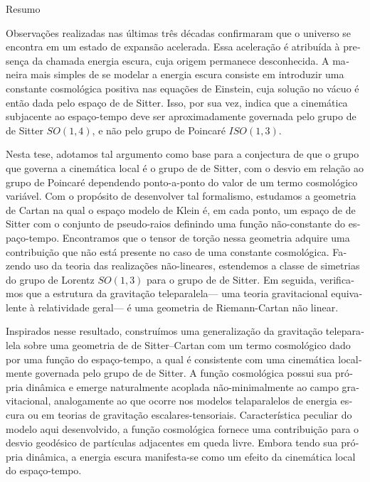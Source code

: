 \begin{otherlanguage}{portuguese}
{\large\selectfont%
\begin{center}Resumo\end{center}}

Observações realizadas nas últimas três décadas confirmaram que 
o universo se encontra em um estado de expansão acelerada. Essa 
ace\-le\-ração é atribuída à presença da chamada energia escura, 
cuja origem permanece desconhecida. A maneira mais simples de se 
modelar a energia escura consiste em introduzir uma constante 
cosmológica positiva nas equações de Einstein, cuja solução no 
vácuo é então dada pelo espaço de de Sitter. Isso, por sua vez, 
indica que a cinemática subjacente ao espaço-tempo deve ser 
aproximadamente governada pelo grupo de de Sitter $SO(1,4)$, 
e não pelo grupo de Poincaré $ISO(1,3)$.

Nesta tese, adotamos tal argumento como base para a conjectura de 
que o grupo que governa a cinemática local é o grupo de de 
Sitter, com o desvio em relação ao grupo de Poincaré dependendo 
ponto-a-ponto do valor de um termo cosmológico variável. Com 
o propósito de desenvolver tal formalismo, estudamos a geometria 
de Cartan na qual o espaço modelo de Klein é, em cada ponto, um 
espaço de de Sitter com o conjunto de pseudo-raios definindo uma 
função não-constante do espaço-tempo.  Encontramos que o tensor 
de torção nessa geo\-metria adquire uma contribuição que não está 
presente no caso de uma constante cosmológica.  Fazendo uso da 
teoria das realizações não-lineares, estendemos a classe de 
simetrias do grupo de Lorentz $SO(1,3)$ para o grupo de de 
Sitter. Em seguida, verificamos que a estrutura da gravitação 
telepa\-ra\-lela--- uma teoria gravitacional equivalente 
à relatividade geral--- é uma geometria de Riemann-Cartan não 
linear.

Inspirados nesse resultado, construímos uma generalização da 
gravitação teleparalela sobre uma geometria de de Sitter--Cartan 
com um termo cosmológico dado por uma função do espaço-tempo, 
a qual é consistente com uma cinemática localmente governada pelo 
grupo de de Sitter. A função cosmológica possui sua própria 
dinâmica e emerge naturalmente acoplada não-minimalmente ao campo 
gravitacional, analogamente ao que ocorre nos modelos 
telaparalelos de energia escura ou em teorias de gravitação 
escalares-tensoriais. Característica peculiar do modelo aqui 
desenvolvido, a função cosmológica fornece uma contribuição para 
o desvio geodésico de partículas adjacentes em queda livre.  
Embora tendo sua própria dinâmica, a energia escura manifesta-se 
como um efeito da cinemática local do espaço-tempo.

\end{otherlanguage}
